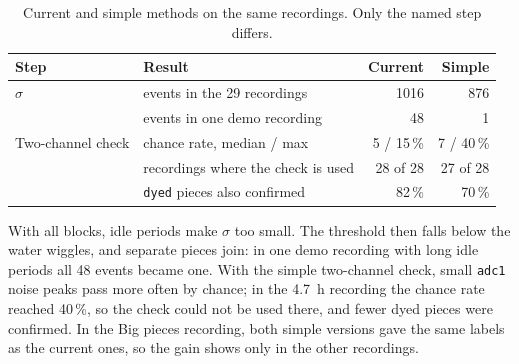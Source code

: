 \begin{table}[H]
  \centering
  \caption{Current and simple methods on the same recordings. Only the named step differs.}
  \label{tab:simple}
  \begin{tabular}{llrr}
    \toprule
    Step & Result & Current & Simple \\
    \midrule
    $\sigma$ & events in the 29 recordings & 1016 & 876 \\
             & events in one demo recording & 48 & 1 \\
    Two-channel check & chance rate, median / max & 5 / 15\,\% & 7 / 40\,\% \\
             & recordings where the check is used & 28 of 28 & 27 of 28 \\
             & \texttt{dyed} pieces also confirmed & 82\,\% & 70\,\% \\
    \bottomrule
  \end{tabular}
\end{table}

With all blocks, idle periods make $\sigma$ too small. The threshold then falls below the water
wiggles, and separate pieces join: in one demo recording with long idle periods all 48 events
became one. With the simple two-channel check, small \texttt{adc1} noise peaks pass more often
by chance; in the \SI{4.7}{\hour} recording the chance rate reached 40\,\%, so the check could
not be used there, and fewer dyed pieces were confirmed. In the Big pieces recording, both
simple versions gave the same labels as the current ones, so the gain shows only in the
other recordings.
